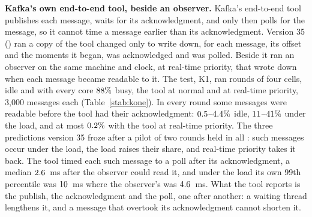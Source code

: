 \documentclass[10pt,journal,onecolumn]{IEEEtran}
\newcommand{\kafka}{Kafka}
\begin{document}
\textbf{\kafka{}'s own end-to-end tool, beside an observer.} \kafka{}'s end-to-end tool publishes
each message, waits for its acknowledgment, and only then polls for the message, so it cannot time
a message earlier than its acknowledgment. Version 35
() ran a copy of the tool changed only to write down, for each
message, its offset and the moments it began, was acknowledged and was polled. Beside it ran an
observer on the same machine and clock, at real-time priority, that wrote down when each message
became readable to it. The test, K1, ran \kOneRoundsWord{} rounds of four cells, idle and with every
core $88\%$ busy, the tool at normal and at real-time priority, 3,000 messages each
(Table~\ref{stab:kone}). In every round some messages were readable before the tool had their
acknowledgment: $0.5$--$4.4\%$ idle,
$\kOneEarlyBusyLo$--$\kOneEarlyBusyHi\%$ under the load, and at most $0.2\%$ with the
tool at real-time priority. The three predictions version 35 froze after a pilot of two rounds held
in all \kOneRoundsWord{}: such messages occur under the load, the load raises their share, and
real-time priority takes it back. The tool timed each such message to a poll after its
acknowledgment, a median $2.6$~ms after the observer could read it, and under the load
its own 99th percentile was $10$~ms where the observer's was $4.6$~ms. What
the tool reports is the publish, the acknowledgment and the poll, one after another: a waiting
thread lengthens it, and a message that overtook its acknowledgment cannot shorten it.

\begin{table}[tb]
\caption{\textbf{Under load, $\kOneEarlyBusyLo$--$\kOneEarlyBusyHi\%$ of the messages \kafka{}'s
end-to-end tool timed were readable before it had their acknowledgment.} K1: the tool's traced copy
beside an observer at real-time priority, \kOneRoundsWord{} rounds of 3,000 messages per cell.
Readable first: the share of messages the observer could read before the tool had their
acknowledgment, with its range over the rounds. $S$: the observer's arrival less the tool's
acknowledgment, each run's median. 99th percentile: the tool's own, in the whole milliseconds it
prints, and the observer's, from each message's start to its arrival. Each figure but the range is
the median over the rounds.}
\label{stab:kone}
\centering
\footnotesize

\end{table}
\end{document}
